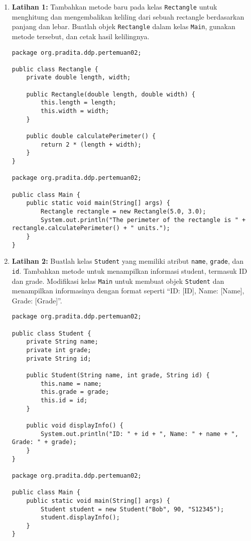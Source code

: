 \begin{enumerate}
\item \textbf{Latihan 1:} Tambahkan metode baru pada kelas \texttt{Rectangle} untuk menghitung dan mengembalikan keliling dari sebuah rectangle berdasarkan panjang dan lebar. Buatlah objek \texttt{Rectangle} dalam kelas \texttt{Main}, gunakan metode tersebut, dan cetak hasil kelilingnya.

\begin{lstlisting}[style=JavaStyle, caption={Latihan 1}]
package org.pradita.ddp.pertemuan02;

public class Rectangle {
	private double length, width;
	
	public Rectangle(double length, double width) {
		this.length = length;
		this.width = width;
	}
	
	public double calculatePerimeter() {
		return 2 * (length + width);
	}
}

package org.pradita.ddp.pertemuan02;

public class Main {
	public static void main(String[] args) {
		Rectangle rectangle = new Rectangle(5.0, 3.0);
		System.out.println("The perimeter of the rectangle is " + rectangle.calculatePerimeter() + " units.");
	}
}
\end{lstlisting}

\item \textbf{Latihan 2:} Buatlah kelas \texttt{Student} yang memiliki atribut \texttt{name}, \texttt{grade}, dan \texttt{id}. Tambahkan metode untuk menampilkan informasi student, termasuk ID dan grade. Modifikasi kelas \texttt{Main} untuk membuat objek \texttt{Student} dan menampilkan informasinya dengan format seperti “ID: [ID], Name: [Name], Grade: [Grade]”.

\begin{lstlisting}[style=JavaStyle, caption={Latihan 2}]
package org.pradita.ddp.pertemuan02;

public class Student {
	private String name;
	private int grade;
	private String id;
	
	public Student(String name, int grade, String id) {
		this.name = name;
		this.grade = grade;
		this.id = id;
	}
	
	public void displayInfo() {
		System.out.println("ID: " + id + ", Name: " + name + ", Grade: " + grade);
	}
}

package org.pradita.ddp.pertemuan02;

public class Main {
	public static void main(String[] args) {
		Student student = new Student("Bob", 90, "S12345");
		student.displayInfo();
	}
}
\end{lstlisting}


\end{enumerate}
